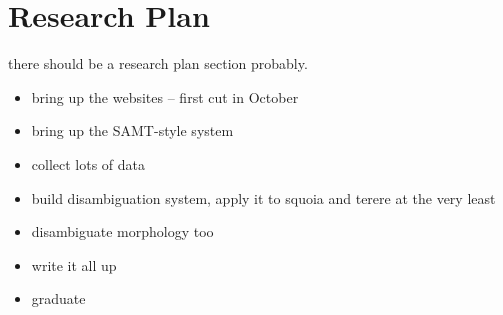 \section{Research Plan}
there should be a research plan section probably.

\begin{itemize}
  \item bring up the websites -- first cut in October
  \item bring up the SAMT-style system
  \item collect lots of data
  \item build disambiguation system, apply it to squoia and terere at the very least
  \item disambiguate morphology too
  \item write it all up
  \item graduate
\end{itemize}
